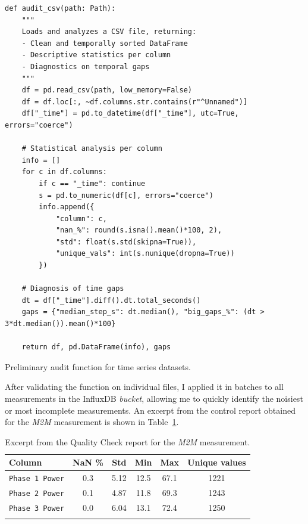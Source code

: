 \begin{listing}[H]
\begin{verbatim}
def audit_csv(path: Path):
    """
    Loads and analyzes a CSV file, returning:
    - Clean and temporally sorted DataFrame
    - Descriptive statistics per column
    - Diagnostics on temporal gaps
    """
    df = pd.read_csv(path, low_memory=False)
    df = df.loc[:, ~df.columns.str.contains(r"^Unnamed")]
    df["_time"] = pd.to_datetime(df["_time"], utc=True, errors="coerce")

    # Statistical analysis per column
    info = []
    for c in df.columns:
        if c == "_time": continue
        s = pd.to_numeric(df[c], errors="coerce")
        info.append({
            "column": c,
            "nan_%": round(s.isna().mean()*100, 2),
            "std": float(s.std(skipna=True)),
            "unique_vals": int(s.nunique(dropna=True))
        })

    # Diagnosis of time gaps
    dt = df["_time"].diff().dt.total_seconds()
    gaps = {"median_step_s": dt.median(), "big_gaps_%": (dt > 3*dt.median()).mean()*100}

    return df, pd.DataFrame(info), gaps
\end{verbatim}
\caption{Preliminary audit function for time series datasets.}
\label{lst:auditcsv}
\end{listing}

After validating the function on individual files, I applied it in batches to all measurements in the InfluxDB \emph{bucket}, allowing me to quickly identify the noisiest or most incomplete measurements.  
An excerpt from the control report obtained for the \emph{M2M} measurement is shown in Table~\ref{tab:qc_m2m}.

\begin{longtable}[H]{| l | c | c | c | c | c |}
\hline
\rowcolor[HTML]{F87C58}\textbf{Column} & \textbf{NaN \%} & \textbf{Std} & \textbf{Min} & \textbf{Max} & \textbf{Unique values} \\
\hline
\texttt{Phase 1 Power} & 0.3 & 5.12 & 12.5 & 67.1 & 1221 \\
\hline
\texttt{Phase 2 Power} & 0.1 & 4.87 & 11.8 & 69.3 & 1243 \\
\hline
\texttt{Phase 3 Power} & 0.0 & 6.04 & 13.1 & 72.4 & 1250 \\
\hline
\caption{Excerpt from the Quality Check report for the \emph{M2M} measurement.}
\label{tab:qc_m2m}
\end{longtable}

